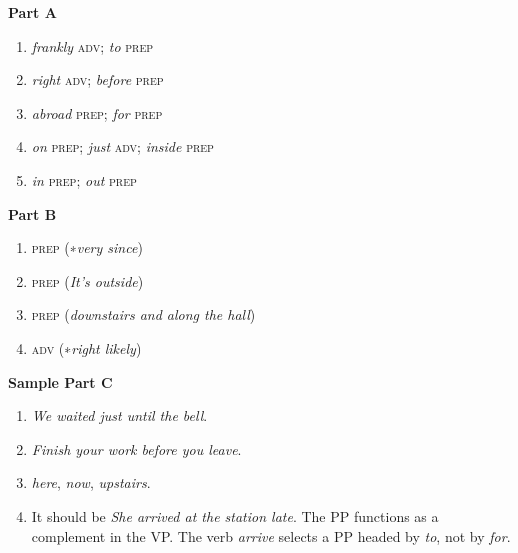\vfill
{\scriptsize
\begin{tcolorbox}[title={Answer Key},colback=white]
\begin{multicols}{2}
\textbf{Part A}
\begin{enumerate}[nosep]
    \item \textit{frankly} \textsc{adv}; \textit{to} \textsc{prep}
    \item \textit{right} \textsc{adv}; \textit{before} \textsc{prep}
    \item \textit{abroad} \textsc{prep}; \textit{for} \textsc{prep}
    \item \textit{on} \textsc{prep}; \textit{just} \textsc{adv}; \textit{inside} \textsc{prep}
    \item \textit{in} \textsc{prep}; \textit{out} \textsc{prep}
\end{enumerate}

\medskip

\textbf{Part B}
\begin{enumerate}[nosep]
    \item \textsc{prep} (∗\textit{very since})
    \item \textsc{prep} (\textit{It's outside})
    \item \textsc{prep} (\textit{downstairs and along the hall})
    \item \textsc{adv} (∗\textit{right likely})
\end{enumerate}
\medskip
\textbf{Sample Part C}
\begin{enumerate}[nosep]
    \item \textit{We waited just until the bell}.
    \item \textit{Finish your work before you leave}.
    \item \textit{here}, \textit{now}, \textit{upstairs}.
    \item It should be \textit{She arrived at the station late}. The PP functions as a complement in the VP. The verb \textit{arrive} selects a PP headed by \textit{to}, not by \textit{for}.
\end{enumerate}

\end{multicols}
\end{tcolorbox}
}%
